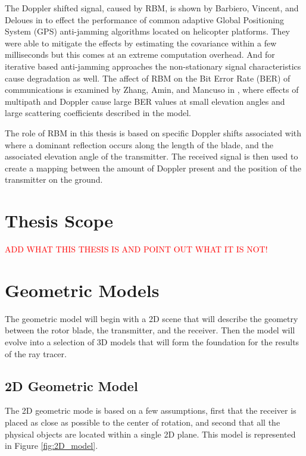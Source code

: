 The Doppler shifted signal, caused by RBM, is shown by Barbiero, Vincent, and Deloues in \cite{F.BarbieroF.VincentT.Deloues2014} to effect the performance of common adaptive Global Positioning System (GPS) anti-jamming algorithms located on helicopter platforms. They were able to mitigate the effects by estimating the covariance within a few milliseconds but this comes at an extreme computation overhead. And for iterative based anti-jamming approaches the non-stationary signal characteristics cause degradation as well. The affect of RBM on the Bit Error Rate (BER) of communications is examined by Zhang, Amin, and Mancuso in \cite{YiminZhang2000}, where effects of multipath and Doppler cause large BER values at small elevation angles and large scattering coefficients described in the model.

The role of RBM in this thesis is based on specific Doppler shifts associated with where a dominant reflection occurs along the length of the blade, and the associated elevation angle of the transmitter. The received signal is then used to create a mapping between the amount of Doppler present and the position of the transmitter on the ground.

\section{Thesis Scope}
\textcolor{red}{ADD WHAT THIS THESIS IS AND POINT OUT WHAT IT IS NOT!}

\section{Geometric Models}
The geometric model will begin with a 2D scene that will describe the geometry between the rotor blade, the transmitter, and the receiver. Then the model will evolve into a selection of 3D models that will form the foundation for the results of the ray tracer.

\subsection{2D Geometric Model}
The 2D geometric mode is based on a few assumptions, first that the receiver is placed as close as possible to the center of rotation, and second that all the physical objects are located within a single 2D plane. This model is represented in Figure \ref{fig:2D_model}.

